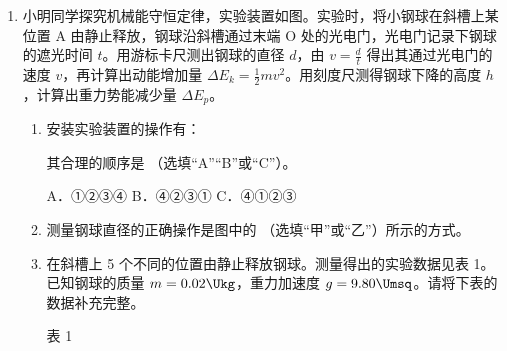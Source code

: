 \documentclass[\gkver]{gaokaozhenti}
\begin{document}
\begin{enumerate}
{设木箱质量为 $M$，对物块与木箱整体，根据牛顿第二定律 $F = (M + m)a$，可得 $F = (m + M)\frac{f}{m}$。即弹簧的最大弹力减小到 $F = (m + M)\frac{f}{m}$ 后，二者一起做简谐运动，故 B 错误；

C．根据 AB 选项分析可知只有当二者一起做简谐运动前，有相对滑动，滑块运动到最右端后物块不会停止，当二者一起做简谐运动后，物块与滑块一起做周期性运动，也不会停止，故 C 错误；

D．开始滑块的加速度向右，物块与滑块第一次共速前，物块相对滑块向左运动，受到向右的摩擦力，共速前二者有相对滑动，摩擦力恒为二者之间的滑动摩擦力，保持不变，故 D 正确。

故选 D。
}

\item
小明同学探究机械能守恒定律，实验装置如图。实验时，将小钢球在斜槽上某位置 A 由静止释放，钢球沿斜槽通过末端 O 处的光电门，光电门记录下钢球的遮光时间 $t$。用游标卡尺测出钢球的直径 $d$，由 $v = \frac{d}{t}$ 得出其通过光电门的速度 $v$，再计算出动能增加量 $\Delta E_{k} = \frac{1}{2}mv^{2}$。用刻度尺测得钢球下降的高度 $h$，计算出重力势能减少量 $\Delta E_{p}$。


\begin{enumerate}
\item
安装实验装置的操作有：
其合理的顺序是 （选填“A”“B”或“C”）。

A．①②③④ \qquad B．④②③① \qquad C．④①②③
\item
测量钢球直径的正确操作是图中的 （选填“甲”或“乙”）所示的方式。

\item
在斜槽上 5 个不同的位置由静止释放钢球。测量得出的实验数据见表 1。已知钢球的质量 $m = 0.02 \Ukg$，重力加速度 $g = 9.80 \Umsq$。请将下表的数据补充完整。

表 1


\end{enumerate}
\end{enumerate}
\end{document}
